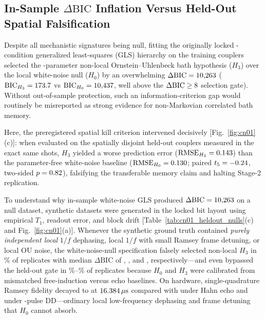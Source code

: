 \documentclass[twocolumn,aps,prapplied,superscriptaddress,floatfix]{revtex4-2}
\begin{document}
\subsection{In-Sample $\Delta\mathrm{BIC}$ Inflation Versus Held-Out Spatial Falsification}

Despite all mechanistic signatures being null, fitting the originally locked \CnLockedConds{}-condition generalized least-squares (GLS) hierarchy on the \CnTrainCouplers{} training couplers selected the \CnBicGate{}-parameter non-local Ornstein--Uhlenbeck bath hypothesis ($H_3$) over the local white-noise null ($H_0$) by an overwhelming $\Delta\mathrm{BIC} = 10{,}263$ ($\mathrm{BIC}_{H_3} = 173.7$ vs $\mathrm{BIC}_{H_0} = 10{,}437$, well above the $\Delta\mathrm{BIC}\ge8$ selection gate). Without out-of-sample protection, such an information-criterion gap would routinely be misreported as strong evidence for non-Markovian correlated bath memory.

Here, the preregistered spatial kill criterion intervened decisively [Fig.~\ref{fig:cn01}(c)]: when evaluated on the \CnHeldOutCouplers{} spatially disjoint held-out couplers measured in the exact same shots, $H_3$ yielded a worse prediction error ($\mathrm{RMSE}_{H_3} = 0.143$) than the parameter-free white-noise baseline ($\mathrm{RMSE}_{H_0} = 0.130$; paired $t_{5} = -0.24$, two-sided $p = 0.82$), falsifying the transferable memory claim and halting Stage-2 replication.

To understand why in-sample white-noise GLS produced $\Delta\mathrm{BIC} = 10{,}263$ on a null dataset, \CnValTotalReps{} synthetic datasets were generated in the locked bit layout using empirical $T_1$, readout error, and block drift [Table~\ref{tab:cn01_heldout_nulls}(c) and Fig.~\ref{fig:cn01}(a)]. Whenever the synthetic ground truth contained \emph{purely independent local} $1/f$ dephasing, local $1/f$ with small Ramsey frame detuning, or local OU noise, the white-noise-null specification falsely selected non-local $H_3$ in \CnValOneFHThreePct\% of replicates with median $\Delta\mathrm{BIC}$ of \CnValOneFMedDbic, \CnValDetunedMedDbic, and \CnValOuMedDbic, respectively—and even bypassed the held-out gate in \CnValLocalStageTwoLowPct\%--\CnValLocalStageTwoHighPct\% of replicates because $H_0$ and $H_3$ were calibrated from mismatched free-induction versus echo baselines. On hardware, single-quadrature Ramsey fidelity decayed to \CnRamseySixteenMean{} at $16.384\,\mu\text{s}$ compared with \CnEchoSixteenMean{} under Hahn echo and \CnDdThirtyTwoSixteenMean{} under \CnDdThirtyTwoPulses{}-pulse DD—ordinary local low-frequency dephasing and frame detuning that $H_0$ cannot absorb.
\end{document}
